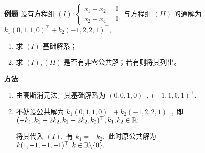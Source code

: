 \begin{itemize}
    \item[\textbf{例题}] 设有方程组 $ (I):\left\{\begin{matrix}
        x_1+x_2 = 0\\ x_2 - x_4 = 0
    \end{matrix}\right. $ 与方程组 $ (II) $ 的通解为 $ k_1(0,1,1,0)^\top+k_2(-1,2,2,1)^\top, $ 
    \begin{enumerate}[label = \Roman*.]
        \item 求 $ (I) $ 基础解系；
        \item 求 $ (I),(II) $ 是否有非零公共解；若有则将其列出。
    \end{enumerate}
    \item[\textbf{方法}]
    \begin{enumerate}[label = \Roman*.]
        \item 由高斯消元法，其基础解系为 $ (0,0,1,0)^\top,(-1,1,0,1)^\top. $ 
        \item 不妨设公共解为 $ k_1(0,1,1,0)^\top + k_2(-1,2,2,1)^\top, $ 即
        $ (-k_2,k_1+2k_2,k_1+2k_2,k_2)^\top, k_1,k_2\in \mathbb R; $ 
        
        将其代入 $ (I), $ 有 $ k_1 = -k_2, $ 此时原公共解为 $ k(1,-1,-1,-1)^\top, k\in \mathbb R\backslash\{0\}. $ 
    \end{enumerate}
\end{itemize}

